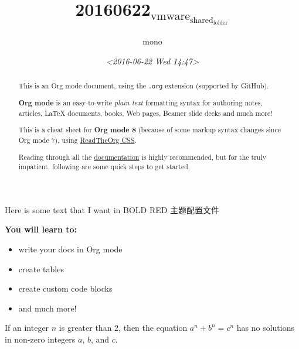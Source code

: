 \documentclass[11pt]{article}
\author{mono}
\date{\textit{<2016-06-22 Wed 14:47>}}
\title{20160622\(_{\text{vmware}}_{\text{shared}}_{\text{folder}}\)}
\begin{document}
\maketitle
Here is some text that I want in BOLD RED
主题配置文件

\begin{sidebar}
\textbf{You will learn to:}

\begin{itemize}
\item write your docs in Org mode
\item create tables
\item create custom code blocks
\item and much more!
\end{itemize}
\end{sidebar}

\begin{abstract}
This is an Org mode document, using the \texttt{.org} extension (supported by GitHub).

\textbf{Org mode} is an easy-to-write \emph{plain text} formatting syntax for authoring notes,
articles, \LaTeX{} documents, books, Web pages, Beamer slide decks and much more!

This is a cheat sheet for \textbf{Org mode 8} (because of some markup syntax changes
since Org mode 7), using \href{https://github.com/fniessen/org-html-themes}{ReadTheOrg CSS}.

Reading through all the \href{http://orgmode.org/org.pdf}{documentation} is highly recommended, but for the truly
impatient, following are some quick steps to get started.
\end{abstract}

\begin{theorem}
If an integer \(n\) is greater than 2, then the equation \(a^n + b^n = c^n\)
has no solutions in non-zero integers \(a\), \(b\), and \(c\).
\end{theorem}
\end{document}
